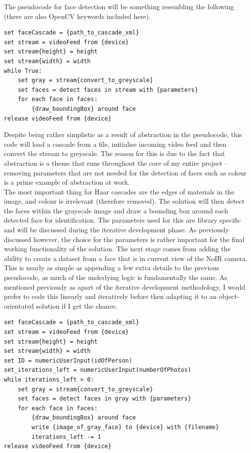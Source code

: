 \documentclass[9pt]{article}
\begin{document}
The pseudocode for face detection will be something resembling the following (there are also OpenCV keywords included here).
\begin{lstlisting}
set faceCascade = {path_to_cascade_xml} 
set stream = videoFeed from {device}
set stream{height} = height
set stream{width} = width
while True:
	set gray = stream{convert_to_greyscale}
	set faces = detect faces in stream with {parameters}
	for each face in faces:
		{draw_boundingBox} around face
release videoFeed from {device}
\end{lstlisting}
Despite being rather simplistic as a result of abstraction in the pseudocode, this code will load a cascade from a file, initialise incoming video feed and then convert the stream to greyscale. The reason for this is due to the fact that abstraction is a theme that runs throughout the core of my entire project -- removing parameters that are not needed for the detection of faces such as colour is a prime example of abstraction at work. \\
The most important thing for Haar cascades are the edges of materials in the image, and colour is irrelevant (therefore removed). The solution will then detect the faces within the grayscale image and draw a bounding box around each detected face for identification. The parameters used for this are library specific and will be discussed during the iterative development phase. As previously discussed however, the choice for the parameters is rather important for the final working functionality of the solution. 
The next stage comes from adding the ability to create a dataset from a face that is in current view of the NoIR camera. This is nearly as simple as appending a few extra details to the previous pseudocode, as much of the underlying logic is fundamentally the same. As mentioned previously as apart of the iterative development methodology, I would prefer to code this linearly and iteratively before then adapting it to an object-orientated solution if I get the chance.
\begin{lstlisting}
set faceCascade = {path_to_cascade_xml} 
set stream = videoFeed from {device}
set stream{height} = height
set stream{width} = width
set ID = numericUserInput(idOfPerson)
set_iterations_left = numericUserInput(numberOfPhotos)
while iterations_left > 0:
	set gray = stream{convert_to_greyscale}
	set faces = detect faces in gray with {parameters}
	for each face in faces:
		{draw_boundingBox} around face
		write {image_of_gray_face} to {device} with {filename}
		iterations_left -= 1
release videoFeed from {device}
\end{lstlisting}
\end{document}

